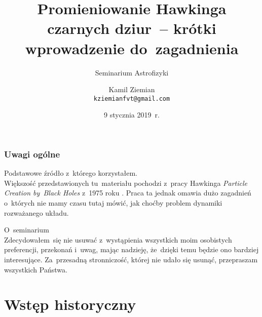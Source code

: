 \documentclass[10pt,t]{beamer}
\title[Promieniowanie Hawkinga]{Promieniowanie Hawkinga czarnych
  dziur~-- krótki wprowadzenie do~zagadnienia}
\subtitle{Seminarium Astrofizyki}
\author{Kamil Ziemian \\
  \texttt{kziemianfvt@gmail.com} }
\institute{Zakład Teorii Pola, \\
  Uniwersytet Jagielloński w~Krakowie}
\date[9 stycznia 2019~r.]{9 stycznia 2019~r.}
\begin{document}






\RaggedRight





\maketitle %










\begin{frame}
  \frametitle{Uwagi ogólne}


  Podstawowe źródło z~którego korzystałem. \\
  Większość przedstawionych tu~materiału pochodzi z~pracy Hawkinga
  \textit{Particle Creation by~Black Holes} z~1975 roku
  \cite{HawkingParticleCreationByBlackHole1975}. Praca ta jednak
  omawia dużo zagadnień o~których nie mamy czasu tutaj mówić, jak
  choćby problem dynamiki rozważanego układu.

  O~seminarium \\
  Zdecydowałem~się nie usuwać z~wystąpienia wszystkich moim
  osobistych preferencji, przekonań i~uwag, mając nadzieję,
  że~dzięki temu będzie ono bardziej interesujące.
  Za~przesadną stronniczość, której nie udało się usunąć,
  przepraszam wszystkich Państwa.

\end{frame}










\section{Wstęp historyczny}
\end{document}

